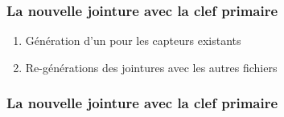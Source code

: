 \begin{frame} 
    \frametitle{La nouvelle jointure avec la clef primaire}
    \begin{enumerate}
        \item<2-> \alert<2>{Génération d'un  pour les capteurs existants}
        \item<3-> \alert<3>{Re-générations des jointures avec les autres fichiers}
    \end{enumerate}
\end{frame}
\begin{frame}[fragile]
    \frametitle{La nouvelle jointure avec la clef primaire}
    \begin{sourcecode}
        
    \end{sourcecode}
\end{frame}

